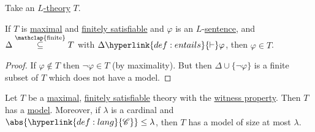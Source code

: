 \documentclass{article}
\newcommand{\named}[1]{\textbf{#1}\index{#1}}
\begin{document}
\begin{ndef}\label{def:5.1x}
  Take an \hyperlink{def:ltheory}{$L$-theory} $T$.
\end{ndef}
\begin{nlemma}\label{lem:5.2x}
  If $T$ is \hyperlink{def:maximal}{maximal} and \hyperlink{def:fs}{finitely satisfiable} and $\varphi$ is an $L$-\hyperlink{def:sentence}{sentence}, and $\Delta \overset{\mathclap{\text{finite}}}\subseteq T$ with $\Delta \hyperlink{def:entails}{\vdash} \varphi$, then $\varphi \in T$.
\end{nlemma}
\begin{proof}
  If $\varphi \notin T$ then $\neg \varphi \in T$ (by maximality).
  But then $\Delta \cup \{\neg \varphi\}$ is a finite subset of $T$ which does not have a model.
\end{proof}
\begin{nlemma}\label{lem:5.3x}
  Let $T$ be a \hyperlink{def:maximal}{maximal}, \hyperlink{def:fs}{finitely satisfiable} theory with the \hyperlink{def:wp}{witness property}.
  Then $T$ has a \hyperlink{def:model}{model}.
  Moreover, if $\lambda$ is a cardinal and $\abs{\hyperlink{def:lang}{\mathscr{C}}} \leq \lambda$, then $T$ has a model of size at most $\lambda$.
\end{nlemma}
\end{document}
